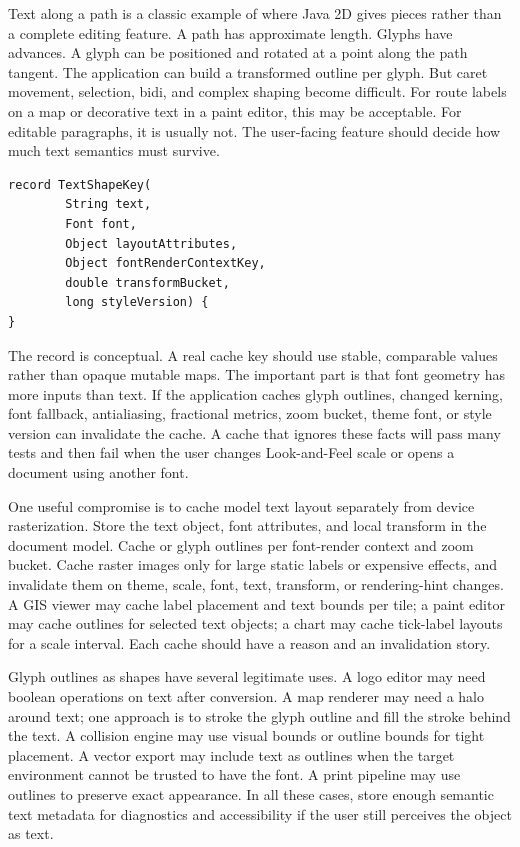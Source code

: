 Text along a path is a classic example of where Java 2D gives pieces rather than a complete editing feature. A path has approximate length. Glyphs have advances. A glyph can be positioned and rotated at a point along the path tangent. The application can build a transformed outline per glyph. But caret movement, selection, bidi, and complex shaping become difficult. For route labels on a map or decorative text in a paint editor, this may be acceptable. For editable paragraphs, it is usually not. The user-facing feature should decide how much text semantics must survive.

\begin{lstlisting}[caption={The shape of a glyph-outline cache key.}]
record TextShapeKey(
        String text,
        Font font,
        Object layoutAttributes,
        Object fontRenderContextKey,
        double transformBucket,
        long styleVersion) {
}
\end{lstlisting}

The record is conceptual. A real cache key should use stable, comparable values rather than opaque mutable maps. The important part is that font geometry has more inputs than text. If the application caches glyph outlines, changed kerning, font fallback, antialiasing, fractional metrics, zoom bucket, theme font, or style version can invalidate the cache. A cache that ignores these facts will pass many tests and then fail when the user changes Look-and-Feel scale or opens a document using another font.

One useful compromise is to cache model text layout separately from device rasterization. Store the text object, font attributes, and local transform in the document model. Cache  or glyph outlines per font-render context and zoom bucket. Cache raster images only for large static labels or expensive effects, and invalidate them on theme, scale, font, text, transform, or rendering-hint changes. A GIS viewer may cache label placement and text bounds per tile; a paint editor may cache outlines for selected text objects; a chart may cache tick-label layouts for a scale interval. Each cache should have a reason and an invalidation story.

Glyph outlines as shapes have several legitimate uses. A logo editor may need boolean operations on text after conversion. A map renderer may need a halo around text; one approach is to stroke the glyph outline and fill the stroke behind the text. A collision engine may use visual bounds or outline bounds for tight placement. A vector export may include text as outlines when the target environment cannot be trusted to have the font. A print pipeline may use outlines to preserve exact appearance. In all these cases, store enough semantic text metadata for diagnostics and accessibility if the user still perceives the object as text.

